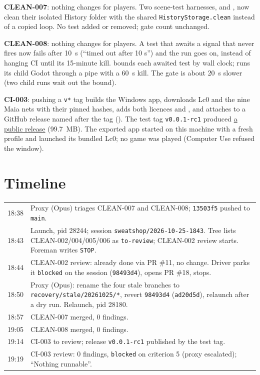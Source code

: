 \documentclass[11pt,a4paper]{article}
\begin{document}
\textbf{CLEAN-007}: nothing changes for players. Two scene-test harnesses,
 and , now clean their isolated
History folder with the shared \texttt{HistoryStorage.clean} instead of a copied loop. No test
added or removed; gate count unchanged.

\textbf{CLEAN-008}: nothing changes for players. A test that awaits a signal that never fires
now fails after 10~s (``timed out after 10 s'') and the run goes on, instead of hanging CI until
its 15-minute kill.  bounds each awaited test by wall clock;
 runs its child Godot through a pipe with a 60~s kill. The gate is
about 20~s slower (two child runs wait out the bound).

\textbf{CI-003}: pushing a \texttt{v*} tag builds the Windows app, downloads Lc0 and the nine
Maia nets with their pinned hashes, adds both licences and , and attaches
 to a GitHub release named after the tag
(). The test tag \texttt{v0.0.1-rc1} produced
\href{https://github.com/Laginho/P-Chess/releases/tag/v0.0.1-rc1}{a public release} (99.7~MB).
The exported app started on this machine with a fresh profile and launched its bundled Lc0; no
game was played (Computer Use refused the window).

\section*{Timeline}

\begin{tabularx}{\linewidth}{@{}lX@{}}
\toprule
18:38 & Proxy (Opus) triages CLEAN-007 and CLEAN-008; \texttt{13503f5} pushed to \texttt{main}. \\
18:43 & Launch, pid 28244; session \texttt{sweatshop/2026-10-25-1843}. Tree lists CLEAN-002/004/005/006 as \texttt{to-review}; CLEAN-002 review starts. Foreman writes \texttt{STOP}. \\
18:44 & CLEAN-002 review: already done via PR \#11, no change. Driver parks it \texttt{blocked} on the session (\texttt{98493d4}), opens PR \#18, stops. \\
18:50 & Proxy (Opus): rename the four stale branches to \texttt{recovery/stale/20261025/*}, revert \texttt{98493d4} (\texttt{ad20d5d}), relaunch after a dry run. Relaunch, pid 28180. \\
18:57 & CLEAN-007 merged, 0 findings. \\
19:05 & CLEAN-008 merged, 0 findings. \\
19:14 & CI-003 to review; release \texttt{v0.0.1-rc1} published by the test tag. \\
19:19 & CI-003 review: 0 findings, \texttt{blocked} on criterion 5 (proxy escalated); ``Nothing runnable''. \\
\bottomrule
\end{tabularx}
\end{document}
